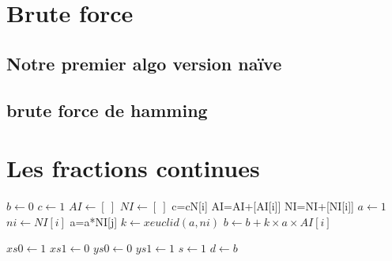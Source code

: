 \documentclass[a4paper, 11pt]{article}
\begin{document}
\newline



\newpage
\section{Brute force}
\subsection{Notre premier algo version naïve }



\subsection{brute force de hamming}


\newpage
\section{Les fractions continues}


\begin{algorithm}
    $ b \leftarrow 0$ \;
    $ c \leftarrow 1$ \;
    $ AI \leftarrow [ \:]$ \;
    $ NI \leftarrow [ \:]$ \;
    {   
        {c=c\times N[i]}
        \Else
        {
            AI=AI+[AI[i]] 
            NI=NI+[NI[i]]
        }
    }
    \For{}
    {
        $a \leftarrow 1 $ \;
        $ni \leftarrow NI[i]$ \;
        {
                { a=a*NI[j]}
        $k \leftarrow xeuclid(a,ni) $ \;
        $b \leftarrow b+k\times a\times AI[i] $ \; 
        }
    }
\end{algorithm}

\begin{algorithm}
    $xs0 \leftarrow 1 $ \;
    $xs1 \leftarrow 0 $ \;
    $ys0 \leftarrow 0 $ \;
    $ys1 \leftarrow 1 $ \;
    $s \leftarrow 1 $ \;
    $d \leftarrow b $ \;
\end{algorithm}
\end{document}
